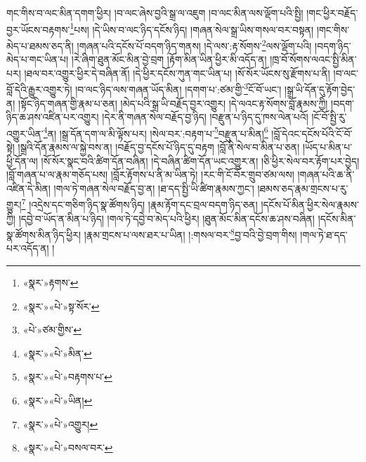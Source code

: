 གང་གིས་བ་ལང་མིན་དགག་ཕྱིར། །བ་ལང་ཞེས་བྱའི་སྒྲ་ལ་འཇུག །བ་ལང་མིན་ལས་ལྡོག་པའི་སྤྱི། །གང་ཕྱིར་བརྗོད་བྱར་ཡོངས་བརྟགས་\footnote{«སྣར་»རྟགས་}པས། །དེ་ཡིས་བ་ལང་ཉིད་དངོས་ཉིད། །གཞན་སེལ་སྒྲ་ཡིས་གསལ་བར་བསྟན། །གང་གིས་མེད་པ་ཐམས་ཅད་ནི། །གཞན་པའི་དངོས་པོ་བདག་ཉིད་གནས། །དེ་ལས་:རྟ་སོགས་\footnote{«སྣར་»«པེ་»སྟ་སོར་}ལས་ལྡོག་པའི། །བདག་ཉིད་མེད་པ་གང་ཡིན་པ། །རེ་ཞིག་ཐུན་མོང་མིན་བྱེ་བྲག །རྟོག་མིན་ཡིན་ཕྱིར་མི་འདོད་ན། །ཁྲ་བོ་སོགས་ལའང་སྤྱི་མིན་པར། །ཐལ་བར་འགྱུར་ཕྱིར་དེ་བཞིན་ནོ། །དེ་ཕྱིར་དངོས་ཀུན་གང་ཡིན་པ། །སོ་སོར་ཡོངས་སུ་རྫོགས་པ་ནི། །བ་ལང་བློ་དེའི་རྒྱུར་འགྱུར་ཏེ། །བ་ལང་ཉིད་ལས་གཞན་ཡོད་མིན། །དགག་པ་:ཙམ་གྱི་\footnote{«པེ་»ཙམ་གྱིས་}ངོ་བོ་ཡང་། །སྒྲ་ཡི་དོན་དུ་རྟོག་བྱེད་ན། །སྟོང་ཉིད་གཞན་གྱི་རྣམ་པ་ཅན། །མེད་པའི་སྒྲ་ཡི་བརྗོད་བྱར་འགྱུར། །དེ་ལའང་རྟ་སོགས་བློ་རྣམས་ཀྱི། །བདག་ཉིད་ཆ་ཤས་འཛིན་པར་འགྱུར། །དེར་ནི་གཞན་སེལ་བརྗོད་བྱ་ཉིད། །བརྫུན་པ་ཉིད་དུ་ཁས་ལེན་པའོ། །ངོ་བོ་སྤྱི་རུ་འགྱུར་ཡིན་\footnote{«སྣར་»«པེ་»མིན་}ན། །སྒྲ་དོན་དག་ལ་མི་ལྟོས་པར། །སེལ་བར་:བརྟག་པ་\footnote{«སྣར་»«པེ་»བརྟགས་པ་}བརྫུན་པ་མིན།\footnote{«སྣར་»«པེ་»ཡིན།} །བློ་དེའང་དངོས་པོའི་ངོ་བོ་སྟེ། །སྒྲའི་དོན་རྣམས་ལ་སྐྱེ་བས་ན། །བརྗོད་བྱ་དངོས་པོ་ཉིད་དུ་བརྟག །བློ་ནི་སེལ་བ་མིན་པ་ཅན། །ཡོད་པ་མིན་པ་ཕྱི་དོན་ལ། །སོ་སོར་སྣང་བའི་ཚིག་དོན་བཞིན། །དེ་བཞིན་ཚིག་དོན་ཡང་འགྱུར་ན། །ཅི་ཕྱིར་སེལ་བར་རྟོག་པར་བྱེད། །བློ་གཞན་པ་ལ་རྣམ་གཅོད་པས། །བློར་རྟོགས་པ་ནི་མ་ཡིན་ཏེ། །རང་གི་ངོ་བོར་གྲུབ་ཙམ་ལས། །གཞན་པའི་ཆ་ནི་འཛིན་དེ་མིན། །གལ་ཏེ་གཞན་སེལ་བརྗོད་བྱ་ན། །ཐ་དད་སྤྱི་ཡི་ཚིག་རྣམས་ཀྱང་། །ཐམས་ཅད་རྣམ་གྲངས་པ་རུ་གྱུར།\footnote{«སྣར་»«པེ་»འགྱུར།} །འདྲེས་དང་གཅིག་ཉིད་སྣ་ཚོགས་ཉིད། །རྣམ་རྟོག་དང་བྲལ་བདག་ཉིད་ཅན། །དངོས་པོ་མིན་ཕྱིར་སེལ་རྣམས་ཀྱི། །དབྱེ་བ་ཡོད་ན་མིན་པ་ཉིད། །གལ་ཏེ་དབྱེ་བ་མེད་པའི་ཕྱིར། །ཐུན་མོང་མིན་དངོས་ཆ་ཤས་བཞིན། །དངོས་མིན་སྣ་ཚོགས་མིན་ཉིད་ཕྱིར། །རྣམ་གྲངས་པ་ལས་ཐར་པ་ཡིན། །:གསལ་བར་\footnote{«སྣར་»«པེ་»བསལ་བར་}བྱ་བའི་བྱེ་བྲག་གིས། །གལ་ཏེ་ཐ་དད་པར་འདོད་ན། །
